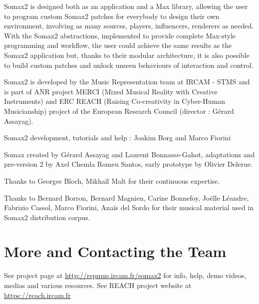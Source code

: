 Somax2 is designed both as an application and a Max library, allowing the user to program custom Somax2 patches for everybody to design their own environment, involving as many sources, players, influencers, renderers as needed. 
With the Somax2 abstractions, implemented to provide complete Max-style programming and workflow, the user could achieve the same results as the Somax2 application but, thanks to their modular architecture, it is also possible to build custom patches and unlock unseen behaviours of interaction and control.

\vspace{5mm}
 
Somax2 is developed by the Music Representation team at IRCAM - STMS and is part of ANR project MERCI (Mixed Musical Reality with Creative Instruments) and ERC REACH (Raising Co-creativity in Cyber-Human Musicianship) project of the European Research Council (director : Gérard Assayag).

\vspace{5mm}

Somax2 development, tutorials and help : Joakim Borg and Marco Fiorini
\vspace{2mm}

Somax created by Gérard Assayag and Laurent Bonnasse-Gahot, adaptations and pre-version 2 by Axel Chemla Romeu Santos, early prototype by Olivier Delerue.
\vspace{2mm}

Thanks to Georges Bloch, Mikhaïl Malt for their continuous expertise.

\vspace{5mm}

Thanks to Bernard Borron, Bernard Magnien, Carine Bonnefoy, Joëlle Léandre, Fabrizio Cassol, Marco Fiorini, Anaïs del Sordo for their musical material used in Somax2 distribution corpus.

\section{More and Contacting the Team}

See project page at \url{http://repmus.ircam.fr/somax2} for info, help, demo videos, medias and various resources. See REACH project website at \url{https://reach.ircam.fr}
